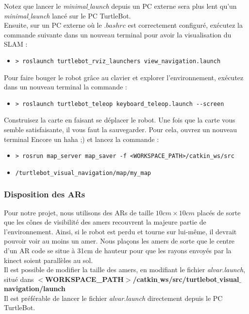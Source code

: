 \documentclass[10pt,a4paper]{article}
\begin{document}
Notez que lancer le \upshape \emph{minimal$\_$launch} depuis un PC externe sera plus lent qu'un \upshape \emph{minimal$\_$launch} lancé sur le PC TurtleBot.\\ 

\vspace{0.5cm}
Ensuite, sur un PC externe où le $.bashrc$ est correctement configuré, exécutez la commande suivante dans un nouveau terminal pour avoir la visualisation du SLAM :

\begin{itemize}
\item[]  \begin{verbatim}> roslaunch turtlebot_rviz_launchers view_navigation.launch \end{verbatim}
\end{itemize}

Pour faire bouger le robot grâce au clavier et explorer l'environnement, exécutez dans un nouveau terminal la commande :

\begin{itemize}
\item[]  \begin{verbatim}> roslaunch turtlebot_teleop keyboard_teleop.launch --screen \end{verbatim}
\end{itemize}

Construisez la carte en faisant se déplacer le robot. Une fois que la carte vous semble satisfaisante, il vous faut la sauvegarder. Pour cela, ouvrez un nouveau terminal Encore un haha ;) et lancez la commande :

\begin{itemize}
\item[]  \begin{verbatim}> rosrun map_server map_saver -f <WORKSPACE_PATH>/catkin_ws/src\end{verbatim}
\item[]  \begin{verbatim}/turtlebot_visual_navigation/map/my_map\end{verbatim}
\end{itemize}

\subsubsection{Disposition des ARs}

Pour notre projet, nous utilisons des ARs de taille $10cm \times 10cm$ placés de sorte que les cônes de visibilité des amers recouvrent la majeure partie de l'environnement. Ainsi, si le robot est perdu et tourne sur lui-même, il devrait pouvoir voir au moins un amer. Nous plaçons les amers de sorte que le centre d'un AR code se situe à 31cm de hauteur pour que les rayons envoyés par la kinect soient parallèles au sol. \\
Il est possible de modifier la taille des amers, en modifiant le fichier \upshape \emph{alvar.launch}, situé dans 
\textbf{$<$WORKSPACE\_PATH$>$/catkin$\_$ws/src/turtlebot$\_$visual$\_$navigation/launch} \\
Il est préférable de lancer le fichier \upshape \emph{alvar.launch} directement depuis le PC TurtleBot.
\end{document}
